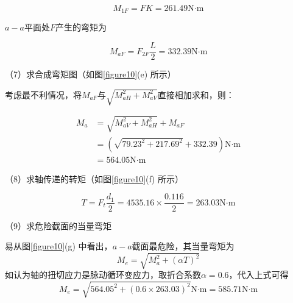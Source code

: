 \documentclass[12pt]{ctexart}
\begin{document}
$$M_{1F}=FK=261.49\text{N·m}$$

$a-a$平面处$F$产生的弯矩为

$$M_{aF}=F_{2F}\frac{L}{2}=332.39\text{N·m}$$

（7）求合成弯矩图（如图\ref{figure10}(e) 所示）

考虑最不利情况，将$M_{aF}$与$\sqrt{M_{aH}^2+M_{aV}^2}$直接相加求和，则：

\begin{align*}
    M_a  & = \sqrt{M_{aV}^2+M_{aH}^2}+M_{aF}\\
         & = (\sqrt{79.23^2+217.69^2}+332.39)\text{N·m}\\
         & = 564.05\text{N·m}
\end{align*}

（8）求轴传递的转矩（如图\ref{figure10}(f) 所示）

$$T=F_t\frac{d_1}{2}=4535.16\times \frac{0.116}{2}=263.03\text{N·m}$$

（9）求危险截面的当量弯矩

易从图\ref{figure10}(g) 中看出，$a-a$截面最危险，其当量弯矩为
$$M_e=\sqrt{M_a^2+(\alpha T)^2}$$
如认为轴的扭切应力是脉动循环变应力，取折合系数$\alpha=0.6$，代入上式可得
$$M_e=\sqrt{564.05^2+(0.6\times 263.03)^2}\text{N·m}=585.71\text{N·m}$$
\end{document}
